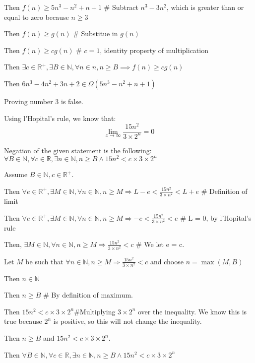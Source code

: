 \documentclass{article}
\begin{document}
\begin{enumerate}
\begin{description}
\begin{description}
		\item Then $f(n) \geq 5n^3 - n^2 + n + 1$ \# Subtract $n^3 - 3n^2$, which is greater than or equal to zero because $n \geq 3$
		\item Then $f(n) \geq g(n)$ \# Substitue in $g(n)$
		\item Then $f(n) \geq cg(n)$ \# $c = 1$, identity property of multiplication
		\end{description}
	\item Then $\exists c \in \mathbb{R}^+, \exists B \in \mathbb{N}, \forall n \in n, n \geq B \implies f(n) \geq cg(n)$
	\item Then $6n^3 - 4n^2 + 3n + 2 \in \Omega(5n^3 - n^2 + n + 1)$
	\end{description}
	
\item Proving number 3 is false.
	\begin{description}
		\item Using l'Hopital's rule, we know that:	
		\begin{equation*}
		\lim_{x\to\infty}\frac{15n^2}{3 \times 2^n}=0
		\end{equation*}
		\item Negation of the given statement is the following: $\forall B \in \mathbb{N}, \forall c \in \mathbb{R}, \exists n \in \mathbb{N}, n\geq B \wedge 15n^2 < c\times 3 \times 2^n$
		\item Assume $B \in \mathbb{N}, c \in \mathbb{R}^+$.
		\begin{description}
			\item Then $\forall e \in \mathbb{R}^+, \exists M \in \mathbb{N}, \forall n \in \mathbb{N}, n \geq M \Rightarrow L - e < \frac{15n^2}{3\times n^2}< L + e$ \# Definition of limit
			\item Then $\forall e \in \mathbb{R}^+, \exists M \in \mathbb{N}, \forall n \in \mathbb{N}, n \geq M \Rightarrow -e < \frac{15n^2}{3\times n^2}< e$ \# L = 0, by l'Hopital's rule
			\item Then, $\exists M \in \mathbb{N}, \forall n \in \mathbb{N}, n \geq M \Rightarrow \frac{15n^2}{3\times n^2} < c$ \# We let e = c.
			\item Let $M$ be such that $\forall n \in \mathbb{N}, n \geq M \Rightarrow \frac{15n^2}{3\times n^2} < c$ and choose $n = \max(M,B)$
			\item Then $n \in \mathbb{N}$
			\item Then $n \geq B$ \# By definition of maximum.
			\item Then $15n^2 < c \times 3 \times 2^n$\#Multiplying $3\times 2^n$ over the inequality. We know this is true because $2^n$ is positive, so this will not change the inequality.
			\item Then $n \geq B$ and $15n^2 < c\times 3\times 2^n$.
		\end{description}
		\item Then $\forall B \in \mathbb{N}, \forall c \in \mathbb{R}, \exists n \in \mathbb{N}, n\geq B \wedge 15n^2 < c\times 3 \times 2^n$
	\end{description}
	

\end{enumerate}
\end{document}
